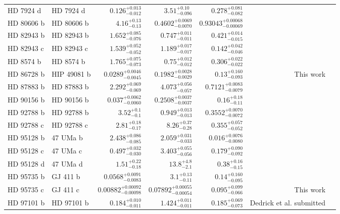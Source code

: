 \begin{longtable*}{llrrrrr}
HD 7924 d & HD 7924 d & $0.126^{+0.013}_{-0.012}$ & $3.51^{+0.10}_{-0.096}$ & $0.278^{+0.081}_{-0.082}$ & \cite{Fulton15} & \\
HD 80606 b & HD 80606 b & $4.16^{+0.13}_{-0.13}$ & $0.4602^{+0.0069}_{-0.0070}$ & $0.93043^{+0.00068}_{-0.00069}$ & \cite{Wittenmyer07} & \\
HD 82943 b & HD 82943 b & $1.652^{+0.085}_{-0.076}$ & $0.747^{+0.011}_{-0.011}$ & $0.421^{+0.014}_{-0.015}$ & \cite{Mayor04} & \\
HD 82943 c & HD 82943 c & $1.539^{+0.052}_{-0.052}$ & $1.189^{+0.017}_{-0.017}$ & $0.142^{+0.042}_{-0.046}$ & \cite{Mayor04} & \\
HD 8574 b & HD 8574 b & $1.765^{+0.075}_{-0.073}$ & $0.75^{+0.012}_{-0.012}$ & $0.306^{+0.022}_{-0.022}$ & \cite{Perrier03} & \\
HD 86728 b & HIP 49081 b & $0.0289^{+0.0046}_{-0.0045}$ & $0.1982^{+0.0028}_{-0.0029}$ & $0.13^{+0.160}_{-0.093}$ & This work & \\
HD 87883 b & HD 87883 b & $2.292^{+0.069}_{-0.069}$ & $4.073^{+0.056}_{-0.057}$ & $0.7121^{+0.0083}_{-0.0079}$ & \cite{Fischer09} & \\
HD 90156 b & HD 90156 b & $0.037^{+0.0062}_{-0.0060}$ & $0.2508^{+0.0037}_{-0.0037}$ & $0.16^{+0.18}_{-0.11}$ & \cite{Mordasini11} & \\
HD 92788 b & HD 92788 b & $3.52^{+0.1}_{-0.1}$ & $0.949^{+0.013}_{-0.013}$ & $0.3552^{+0.0070}_{-0.0072}$ & \cite{Fischer01} & \\
HD 92788 c & HD 92788 c & $2.81^{+0.18}_{-0.17}$ & $8.26^{+0.37}_{-0.28}$ & $0.355^{+0.057}_{-0.052}$ & \cite{Rickman19} & \\
HD 95128 b & 47 UMa b & $2.438^{+0.086}_{-0.085}$ & $2.059^{+0.031}_{-0.033}$ & $0.016^{+0.0076}_{-0.0080}$ & \cite{Naef04} & \\
HD 95128 c & 47 UMa c & $0.497^{+0.032}_{-0.030}$ & $3.403^{+0.055}_{-0.056}$ & $0.179^{+0.090}_{-0.092}$ & \cite{Wittenmyer07} & \\
HD 95128 d & 47 UMa d & $1.51^{+0.22}_{-0.18}$ & $13.8^{+4.8}_{-2.1}$ & $0.38^{+0.16}_{-0.15}$ & \cite{Gregory10} & \\
HD 95735 b & GJ 411 b & $0.0568^{+0.0091}_{-0.0083}$ & $3.1^{+0.13}_{-0.11}$ & $0.14^{+0.160}_{-0.095}$ & \cite{Diaz19} & \\
HD 95735 c & GJ 411 c & $0.00882^{+0.00092}_{-0.00098}$ & $0.07892^{+0.00055}_{-0.00054}$ & $0.095^{+0.099}_{-0.066}$ & This work & \\
HD 97101 b & HD 97101 b & $0.184^{+0.010}_{-0.011}$ & $1.424^{+0.011}_{-0.011}$ & $0.185^{+0.069}_{-0.073}$ & Dedrick et al. submitted & \\

\end{longtable*}

